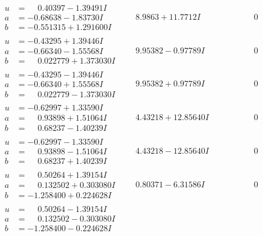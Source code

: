 \documentclass[1p]{elsarticle_modified}
\theoremstyle{definition}
\begin{document}
$$\begin{array}{c|c|c}
\begin{aligned}
u &= \phantom{-}0.40397 - 1.39491 I \\
a &= -0.68638 - 1.83730 I \\
b &= -0.551315 + 1.291600 I\end{aligned}
 & \phantom{-}8.9863 + 11.7712 I & \phantom{-0.000000 } 0 \\ \hline\begin{aligned}
u &= -0.43295 + 1.39446 I \\
a &= -0.66340 - 1.55568 I \\
b &= \phantom{-}0.022779 + 1.373030 I\end{aligned}
 & \phantom{-}9.95382 - 0.97789 I & \phantom{-0.000000 } 0 \\ \hline\begin{aligned}
u &= -0.43295 - 1.39446 I \\
a &= -0.66340 + 1.55568 I \\
b &= \phantom{-}0.022779 - 1.373030 I\end{aligned}
 & \phantom{-}9.95382 + 0.97789 I & \phantom{-0.000000 } 0 \\ \hline\begin{aligned}
u &= -0.62997 + 1.33590 I \\
a &= \phantom{-}0.93898 + 1.51064 I \\
b &= \phantom{-}0.68237 - 1.40239 I\end{aligned}
 & \phantom{-}4.43218 + 12.85640 I & \phantom{-0.000000 } 0 \\ \hline\begin{aligned}
u &= -0.62997 - 1.33590 I \\
a &= \phantom{-}0.93898 - 1.51064 I \\
b &= \phantom{-}0.68237 + 1.40239 I\end{aligned}
 & \phantom{-}4.43218 - 12.85640 I & \phantom{-0.000000 } 0 \\ \hline\begin{aligned}
u &= \phantom{-}0.50264 + 1.39154 I \\
a &= \phantom{-}0.132502 + 0.303080 I \\
b &= -1.258400 + 0.224628 I\end{aligned}
 & \phantom{-}0.80371 - 6.31586 I & \phantom{-0.000000 } 0 \\ \hline\begin{aligned}
u &= \phantom{-}0.50264 - 1.39154 I \\
a &= \phantom{-}0.132502 - 0.303080 I \\
b &= -1.258400 - 0.224628 I\end{aligned}

\end{array}$$
\end{document}
